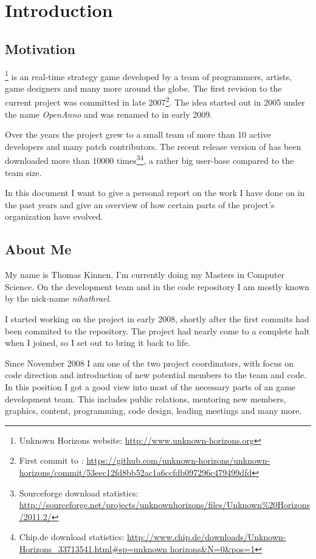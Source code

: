

\section{Introduction}

\subsection{Motivation}
\UH{}\footnote{Unknown Horizons website: \url{http://www.unknown-horizons.org}} is an \OS{} real-time strategy game developed by a team of programmers, artists, game
designers and many more around the globe. The first revision to the current project was committed in late 2007\footnote{First commit to \UH{}:
\url{https://github.com/unknown-horizons/unknown-horizons/commit/53eec12fd8bb52ac1a6ccfdb097296c479499dfd}}. The idea
started out in 2005 under the name \textit{OpenAnno} and was renamed to \UH{} in early 2009.

Over the years the project grew to a small team of more than 10 active developers and many
patch contributors. The recent release version of \UH{} has been downloaded more than 10000 times\footnote{Sourceforge
download statistics:
\url{http://sourceforge.net/projects/unknownhorizons/files/Unknown\%20Horizons/2011.2/}}\footnote{Chip.de download
statistics: \url{http://www.chip.de/downloads/Unknown-Horizons_33713541.html\#sp=unknown horizons\&N=0\&pos=1}}, a rather
big user-base compared to the team size.

In this document I want to give a personal report on the work I have done on \UH{} in the past years and give an
overview of how certain parts of the project's organization have evolved.

\subsection{About Me}
My name is Thomas Kinnen, I'm currently doing my Masters in Computer Science. On the development team and in the code
repository I am mostly known by the nick-name \textit{nihathrael}.

I started working on the project in early 2008, shortly after the first commits had been commited to the repository. 
The project had nearly come to a complete halt when I joined, so I set out to bring it back to life.

Since November 2008 I am one of the two project coordinators, with focus on code direction and introduction of new
potential members to the team and code. In this position I got a good view into most of the necessary parts of an \OS{}
game development team. This includes public relations, mentoring new members, graphics, content, programming, code
design, leading meetings and many more.

